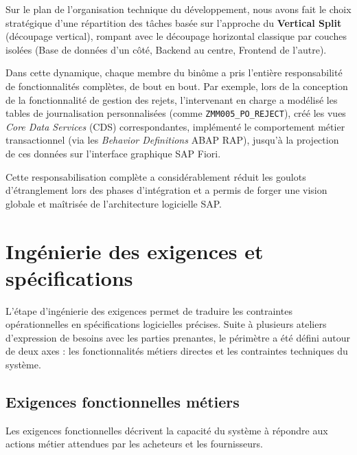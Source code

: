 \documentclass[12pt,a4paper,oneside]{report}
\begin{document}
Sur le plan de l'organisation technique du développement, nous avons fait le choix stratégique d'une répartition des tâches basée sur l'approche du \textbf{Vertical Split} (découpage vertical), rompant avec le découpage horizontal classique par couches isolées (Base de données d'un côté, Backend au centre, Frontend de l'autre).

Dans cette dynamique, chaque membre du binôme a pris l'entière responsabilité de fonctionnalités complètes, de bout en bout. Par exemple, lors de la conception de la fonctionnalité de gestion des rejets, l'intervenant en charge a modélisé les tables de journalisation personnalisées (comme \texttt{ZMM005\_PO\_REJECT}), créé les vues \textit{Core Data Services} (CDS) correspondantes, implémenté le comportement métier transactionnel (via les \textit{Behavior Definitions} ABAP RAP), jusqu'à la projection de ces données sur l'interface graphique SAP Fiori.

Cette responsabilisation complète a considérablement réduit les goulots d'étranglement lors des phases d'intégration et a permis de forger une vision globale et maîtrisée de l'architecture logicielle SAP.

\section{Ingénierie des exigences et spécifications}\label{ch4:analyse-besoins}

L'étape d'ingénierie des exigences permet de traduire les contraintes opérationnelles en spécifications logicielles précises. Suite à plusieurs ateliers d'expression de besoins avec les parties prenantes, le périmètre a été défini autour de deux axes : les fonctionnalités métiers directes et les contraintes techniques du système.

\subsection{Exigences fonctionnelles métiers}\label{ch4:besoins-f}
Les exigences fonctionnelles décrivent la capacité du système à répondre aux actions métier attendues par les acheteurs et les fournisseurs.
\end{document}
